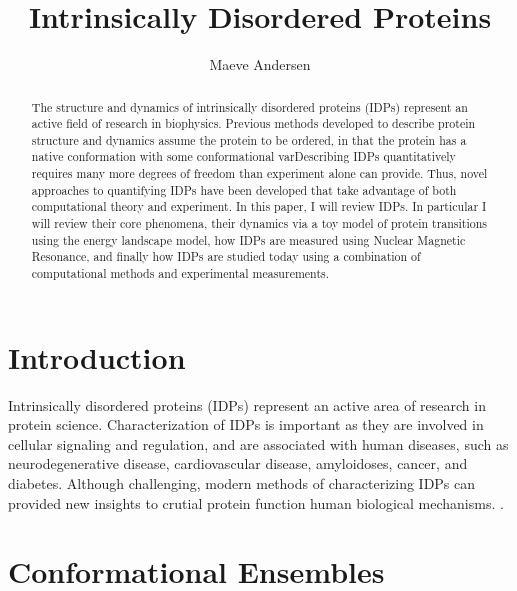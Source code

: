 \documentclass{article}
\title{Intrinsically Disordered Proteins}
\author{Maeve Andersen}
\begin{document}
\maketitle

\begin{abstract}
    The structure and dynamics of intrinsically disordered proteins (IDPs) represent an active field of research in biophysics.
    Previous methods developed to describe protein structure and dynamics assume the protein to be ordered, in that the protein has a native conformation with some conformational varDescribing IDPs quantitatively requires many more degrees of freedom than experiment alone can provide.
    Thus, novel approaches to quantifying IDPs have been developed that take advantage of both computational theory and experiment. 
 In this paper, I will review IDPs. In particular I will review their core phenomena, their dynamics via a toy model of protein transitions using the energy landscape model, how IDPs are measured using Nuclear Magnetic Resonance, and finally how IDPs are studied today using a combination of computational methods and experimental measurements.
\end{abstract}


\section{Introduction}

Intrinsically disordered proteins (IDPs) represent an active area of research in protein science.
Characterization of IDPs is important as they are involved in cellular signaling and regulation,\cite{wrightIntrinsicallyDisorderedProteins2015}
and are associated with human diseases, such as neurodegenerative disease, cardiovascular disease, amyloidoses, cancer, and diabetes.\cite{uverskyIntrinsicallyDisorderedProteins2008}
Although challenging, modern methods of characterizing IDPs can provided new insights to crutial protein function human biological mechanisms. \cite{bonomiSimultaneousDeterminationProtein2018}.

\section{Conformational Ensembles}
\end{document}
